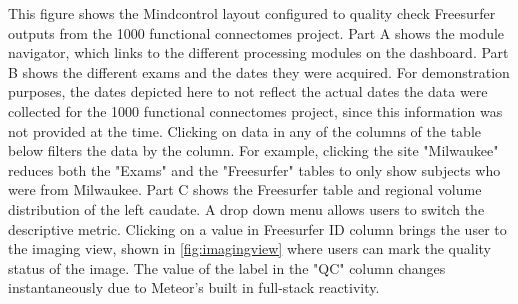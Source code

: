 \label{fig:dashboard}

This figure shows the Mindcontrol layout configured to quality check Freesurfer outputs from the 1000 functional connectomes project. Part A shows the module navigator, which links to the different processing modules on the dashboard. Part B shows the different exams and the dates they were acquired. For demonstration purposes, the dates depicted here to not reflect the actual dates the data were collected for the 1000 functional connectomes project, since this information was not provided at the time. Clicking on data in any of the columns of the table below filters the data by the column. For example, clicking the site "Milwaukee" reduces both the "Exams" and the "Freesurfer" tables to only show subjects who were from Milwaukee. Part C shows the Freesurfer table and regional volume distribution of the left caudate. A drop down menu allows users to switch the descriptive metric. Clicking on a value in Freesurfer ID column brings the user to the imaging view, shown in \ref{fig:imagingview} where users can mark the quality status of the image. The value of the label in the "QC" column changes instantaneously due to Meteor's built in full-stack reactivity. 